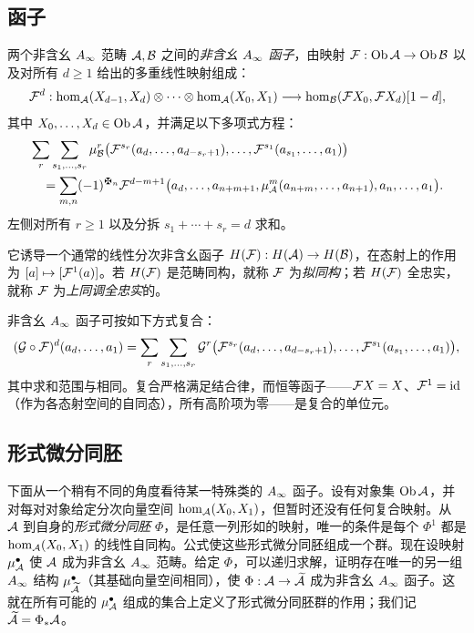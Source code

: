 \subsection{函子}\label{sec:1b}
\begin{definition*}
两个非含幺 $A_\infty$ 范畴 $\mathcal A,\mathcal B$ 之间的\emph{非含幺 $A_\infty$ 函子}，由映射 $\mathcal F:\operatorname{Ob}\mathcal A\to\operatorname{Ob}\mathcal B$ 以及对所有 $d\ge1$ 给出的多重线性映射组成：
\begin{equation}\label{eq:1.5}
\mathcal F^d:\hom_{\mathcal A}(X_{d-1},X_d)\otimes\cdots\otimes\hom_{\mathcal A}(X_0,X_1)\longrightarrow\hom_{\mathcal B}(\mathcal F X_0,\mathcal F X_d)[1-d],
\end{equation}
其中 $X_0,\ldots,X_d\in\operatorname{Ob}\mathcal A$，并满足以下多项式方程：
\begin{equation}\label{eq:1.6}
\begin{aligned}
&\sum_r\sum_{s_1,\ldots,s_r}\mu^r_{\B}\bigl(\F^{s_r}(a_d,\ldots,a_{d-s_r+1}),\ldots,\F^{s_1}(a_{s_1},\ldots,a_1)\bigr)\\
&\quad=\sum_{m,n}(-1)^{\sgnmark_n}\F^{d-m+1}\bigl(a_d,\ldots,a_{n+m+1},\mu^m_{\A}(a_{n+m},\ldots,a_{n+1}),a_n,\ldots,a_1\bigr).
\end{aligned}
\end{equation}
左侧对所有 $r\ge1$ 以及分拆 $s_1+\cdots+s_r=d$ 求和。
\end{definition*}

\begin{definition*}
它诱导一个通常的线性分次非含幺函子 $H(\mathcal F):H(\mathcal A)\to H(\mathcal B)$，在态射上的作用为 $[a]\mapsto[\mathcal F^1(a)]$。若 $H(\mathcal F)$ 是范畴同构，就称 $\mathcal F$ 为\emph{拟同构}；若 $H(\mathcal F)$ 全忠实，就称 $\mathcal F$ 为\emph{上同调全忠实}的。
\end{definition*}

非含幺 $A_\infty$ 函子可按如下方式复合：
\begin{equation}\label{eq:1.7}
\begin{aligned}
(\mathcal G\circ\mathcal F)^d(a_d,\ldots,a_1)
=\sum_r\sum_{s_1,\ldots,s_r}\mathcal G^r\bigl(\mathcal F^{s_r}(a_d,\ldots,a_{d-s_r+1}),\ldots,\mathcal F^{s_1}(a_{s_1},\ldots,a_1)\bigr),
\end{aligned}
\end{equation}
其中求和范围与相同。复合严格满足结合律，而恒等函子——$\mathcal F X=X$、$\mathcal F^1=\operatorname{id}$（作为各态射空间的自同态），所有高阶项为零——是复合的单位元。

\subsection{形式微分同胚}\label{sec:1c}
\begin{definition*}
下面从一个稍有不同的角度看待某一特殊类的 $A_\infty$ 函子。设有对象集 $\operatorname{Ob}\mathcal A$，并对每对对象给定分次向量空间 $\hom_{\mathcal A}(X_0,X_1)$，但暂时还没有任何复合映射。从 $\mathcal A$ 到自身的\emph{形式微分同胚} $\Phi$，是任意一列形如的映射，唯一的条件是每个 $\Phi^1$ 都是 $\hom_{\mathcal A}(X_0,X_1)$ 的线性自同构。公式使这些形式微分同胚组成一个群。现在设映射 $\mu^{\bullet}_{\mathcal A}$ 使 $\mathcal A$ 成为非含幺 $A_\infty$ 范畴。给定 $\Phi$，可以递归求解，证明存在唯一的另一组 $A_\infty$ 结构 $\mu^{\bullet}_{\widetilde{\mathcal A}}$（其基础向量空间相同），使 $\Phi:\mathcal A\to\widetilde{\mathcal A}$ 成为非含幺 $A_\infty$ 函子。这就在所有可能的 $\mu^{\bullet}_{\mathcal A}$ 组成的集合上定义了形式微分同胚群的作用；我们记 $\widetilde{\mathcal A}=\Phi_*\mathcal A$。
\end{definition*}

